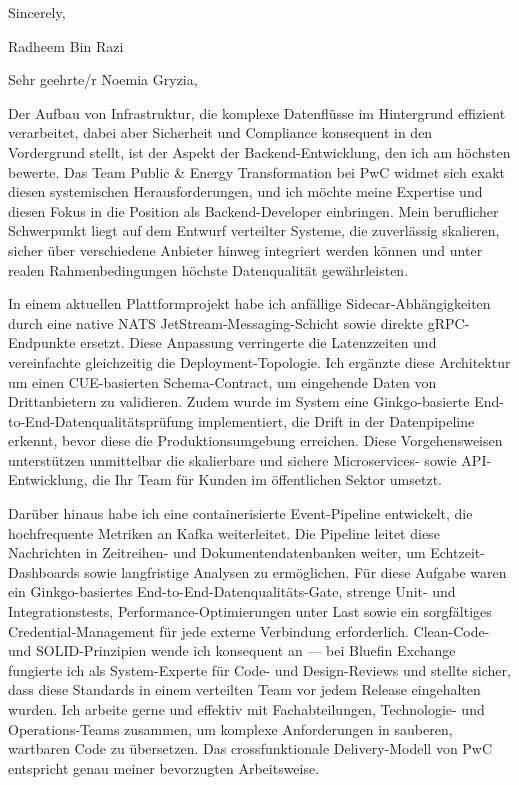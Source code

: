 \documentclass[11pt,a4paper]{coverletter}
\begin{document}
\closing{Sincerely,}{Radheem Bin Razi}

\clearpage
{}


\opening{Sehr geehrte/r Noemia Gryzia,}

Der Aufbau von Infrastruktur, die komplexe Datenflüsse im Hintergrund effizient verarbeitet, dabei aber Sicherheit und Compliance konsequent in den Vordergrund stellt, ist der Aspekt der Backend-Entwicklung, den ich am höchsten bewerte. Das Team Public \& Energy Transformation bei PwC widmet sich exakt diesen systemischen Herausforderungen, und ich möchte meine Expertise und diesen Fokus in die Position als Backend-Developer einbringen. Mein beruflicher Schwerpunkt liegt auf dem Entwurf verteilter Systeme, die zuverlässig skalieren, sicher über verschiedene Anbieter hinweg integriert werden können und unter realen Rahmenbedingungen höchste Datenqualität gewährleisten.

In einem aktuellen Plattformprojekt habe ich anfällige Sidecar-Abhängigkeiten durch eine native NATS JetStream-Messaging-Schicht sowie direkte gRPC-Endpunkte ersetzt. Diese Anpassung verringerte die Latenzzeiten und vereinfachte gleichzeitig die Deployment-Topologie. Ich ergänzte diese Architektur um einen CUE-basierten Schema-Contract, um eingehende Daten von Drittanbietern zu validieren. Zudem wurde im System eine Ginkgo-basierte End-to-End-Datenqualitätsprüfung implementiert, die Drift in der Datenpipeline erkennt, bevor diese die Produktionsumgebung erreichen. Diese Vorgehensweisen unterstützen unmittelbar die skalierbare und sichere Microservices- sowie API-Entwicklung, die Ihr Team für Kunden im öffentlichen Sektor umsetzt.

Darüber hinaus habe ich eine containerisierte Event-Pipeline entwickelt, die hochfrequente Metriken an Kafka weiterleitet. Die Pipeline leitet diese Nachrichten in Zeitreihen- und Dokumentendatenbanken weiter, um Echtzeit-Dashboards sowie langfristige Analysen zu ermöglichen. Für diese Aufgabe waren ein Ginkgo-basiertes End-to-End-Datenqualitäts-Gate, strenge Unit- und Integrationstests, Performance-Optimierungen unter Last sowie ein sorgfältiges Credential-Management für jede externe Verbindung erforderlich. Clean-Code- und SOLID-Prinzipien wende ich konsequent an — bei Bluefin Exchange fungierte ich als System-Experte für Code- und Design-Reviews und stellte sicher, dass diese Standards in einem verteilten Team vor jedem Release eingehalten wurden. Ich arbeite gerne und effektiv mit Fachabteilungen, Technologie- und Operations-Teams zusammen, um komplexe Anforderungen in sauberen, wartbaren Code zu übersetzen. Das crossfunktionale Delivery-Modell von PwC entspricht genau meiner bevorzugten Arbeitsweise.
\end{document}
